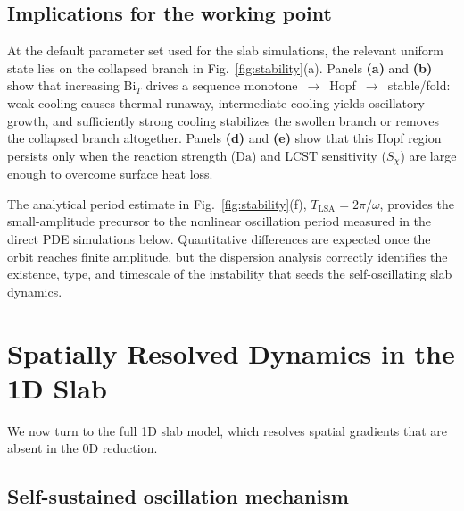 \documentclass[aps,pre,reprint,superscriptaddress,longbibliography,floatfix]{revtex4-2}
\newcommand{\Da}{\mathrm{Da}}
\newcommand{\Bi}{\mathrm{Bi}}
\begin{document}
\subsection{Implications for the working point}
\label{sec:0d_mechanism}

At the default parameter set used for the slab simulations, the relevant
uniform state lies on the collapsed branch in
Fig.~\ref{fig:stability}(a). Panels \textbf{(a)} and \textbf{(b)} show
that increasing $\Bi_T$ drives a sequence
monotone~$\rightarrow$~Hopf~$\rightarrow$~stable/fold: weak cooling
causes thermal runaway, intermediate cooling yields oscillatory growth,
and sufficiently strong cooling stabilizes the swollen branch or removes
the collapsed branch altogether. Panels \textbf{(d)} and \textbf{(e)}
show that this Hopf region persists only when the reaction strength
($\Da$) and LCST sensitivity ($S_\chi$) are large enough to overcome
surface heat loss.

The analytical period estimate in Fig.~\ref{fig:stability}(f),
$T_{\mathrm{LSA}}=2\pi/\omega$, provides the small-amplitude precursor
to the nonlinear oscillation period measured in the direct PDE
simulations below. Quantitative differences are expected once the orbit
reaches finite amplitude, but the dispersion analysis correctly
identifies the existence, type, and timescale of the instability that
seeds the self-oscillating slab dynamics.


\section{Spatially Resolved Dynamics in the 1D Slab}
\label{sec:slab}

We now turn to the full 1D slab model, which resolves spatial gradients
that are absent in the 0D reduction.

\subsection{Self-sustained oscillation mechanism}
\label{sec:osc_mech}
\end{document}
